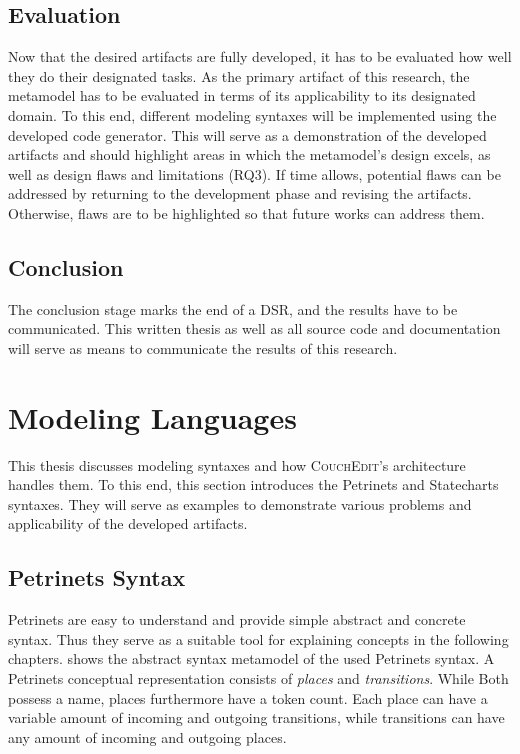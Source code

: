 \subsection{Evaluation}
Now that the desired artifacts are fully developed, it has to be evaluated how well they do their designated tasks. As the primary artifact of this research, the metamodel has to be evaluated in terms of its applicability to its designated domain. To this end, different modeling syntaxes will be implemented using the developed code generator. This will serve as a demonstration of the developed artifacts and should highlight areas in which the metamodel's design excels, as well as design flaws and limitations (RQ3). If time allows, potential flaws can be addressed by returning to the development phase and revising the artifacts. Otherwise, flaws are to be highlighted so that future works can address them.

\subsection{Conclusion}
The conclusion stage marks the end of a DSR, and the results have to be communicated. This written thesis as well as all source code and documentation will serve as means to communicate the results of this research.


\section{Modeling Languages}
\label{sec:modeling-languages}
This thesis discusses modeling syntaxes and how \textsc{CouchEdit}'s architecture handles them. To this end, this section introduces the Petrinets and Statecharts syntaxes. They will serve as examples to demonstrate various problems and applicability of the developed artifacts. 

\subsection{Petrinets Syntax}
\label{sec:petrinets}
Petrinets are easy to understand and provide simple abstract and concrete syntax. Thus they serve as a suitable tool for explaining concepts in the following chapters.  shows the abstract syntax metamodel of the used Petrinets syntax. A Petrinets conceptual representation consists of \emph{places} and \emph{transitions}. While Both possess a name, places furthermore have a token count. Each place can have a variable amount of incoming and outgoing transitions, while transitions can have any amount of incoming and outgoing places. 

